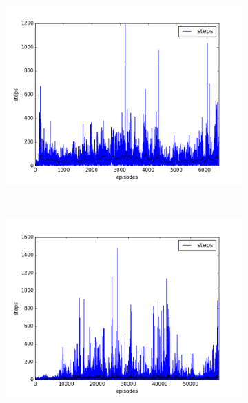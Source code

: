 \begin{figure}[t]
  \vspace*{-2.25cm}
  \begin{subfigure}[t]{\figscale\linewidth}
    \hspace*{-2.75cm}
    \includegraphics[width=1.5\textwidth]
    {../results/dqn_1vs2/steps.png}
    \label{fig:dqn-1vs2-steps}
  \end{subfigure}
  ~
  \begin{subfigure}[t]{\figscale\linewidth}
    \hspace*{-1.4cm}
    \includegraphics[width=1.5\textwidth]
    {../results/ddpg_1vs2/steps.png}
    \label{fig:ddpg-1vs2-steps}
  \end{subfigure}

\end{figure}
